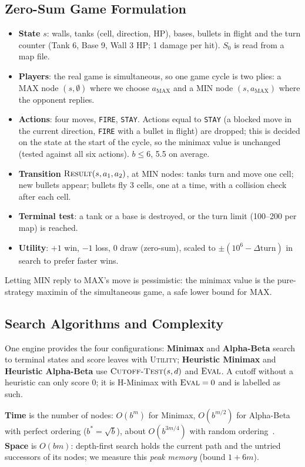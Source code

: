 \documentclass[conference]{IEEEtran}
\begin{document}
\subsection{Zero-Sum Game Formulation}
\begin{itemize}
    \item \textbf{State} $s$: walls, tanks (cell, direction, HP), bases, bullets in flight and the turn counter (Tank 6, Base 9, Wall 3 HP; 1 damage per hit). $S_0$ is read from a map file.
    \item \textbf{Players}: the real game is simultaneous, so one game cycle is two plies: a MAX node $(s,\emptyset)$ where we choose $a_{\text{MAX}}$ and a MIN node $(s,a_{\text{MAX}})$ where the opponent replies.
    \item \textbf{Actions}: four moves, \texttt{FIRE}, \texttt{STAY}. Actions equal to \texttt{STAY} (a blocked move in the current direction, \texttt{FIRE} with a bullet in flight) are dropped; this is decided on the state at the start of the cycle, so the minimax value is unchanged (tested against all six actions). $b\le 6$, 5.5 on average.
    \item \textbf{Transition} $\textsc{Result}(s,a_1,a_2)$, at MIN nodes: tanks turn and move one cell; new bullets appear; bullets fly 3 cells, one at a time, with a collision check after each cell.
    \item \textbf{Terminal test}: a tank or a base is destroyed, or the turn limit (100--200 per map) is reached.
    \item \textbf{Utility}: $+1$ win, $-1$ loss, $0$ draw (zero-sum), scaled to $\pm(10^6-\Delta\text{turn})$ in search to prefer faster wins.
\end{itemize}
Letting MIN reply to MAX's move is pessimistic: the minimax value is the pure-strategy maximin of the simultaneous game, a safe lower bound for MAX.

\subsection{Search Algorithms and Complexity}
One engine provides the four configurations: \textbf{Minimax} and \textbf{Alpha-Beta} search to terminal states and score leaves with \textsc{Utility}; \textbf{Heuristic Minimax} and \textbf{Heuristic Alpha-Beta} use $\textsc{Cutoff-Test}(s,d)$ and $\textsc{Eval}$. A cutoff without a heuristic can only score 0; it is H-Minimax with $\textsc{Eval}=0$ and is labelled as such.

\textbf{Time} is the number of nodes: $O(b^m)$ for Minimax, $O(b^{m/2})$ for Alpha-Beta with perfect ordering ($b^*=\sqrt{b}$), about $O(b^{3m/4})$ with random ordering~\cite{alphabeta}. \textbf{Space} is $O(bm)$: depth-first search holds the current path and the untried successors of its nodes; we measure this \emph{peak memory} (bound $1+6m$).
\end{document}
